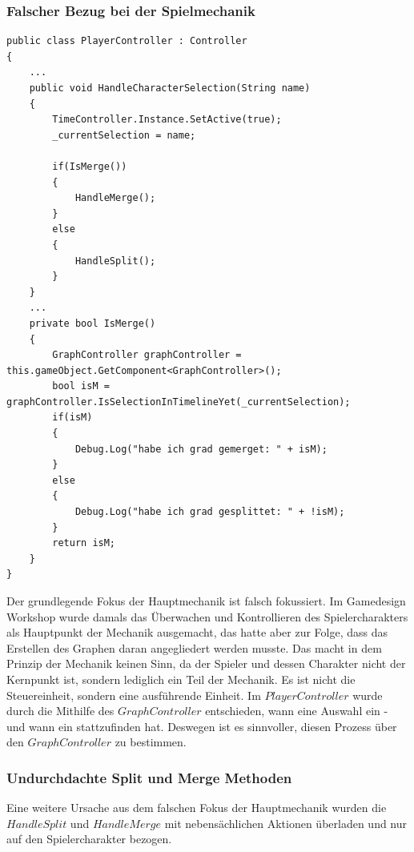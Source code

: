 \subsubsection{Falscher Bezug bei der Spielmechanik}
\begin{lstlisting}[caption={HandleCharacterSelection in der PlayerController.cs Klasse}, label={sec:playercontroller_old}]
public class PlayerController : Controller
{
    ...
    public void HandleCharacterSelection(String name)
    {
        TimeController.Instance.SetActive(true);
        _currentSelection = name;
        
        if(IsMerge())
        {
            HandleMerge();
        }
        else
        {
            HandleSplit();
        }
    }
    ...
    private bool IsMerge()
    {
        GraphController graphController = this.gameObject.GetComponent<GraphController>();
        bool isM = graphController.IsSelectionInTimelineYet(_currentSelection);
        if(isM)
        {   
            Debug.Log("habe ich grad gemerget: " + isM);
        }
        else
        {
            Debug.Log("habe ich grad gesplittet: " + !isM);
        }
        return isM;
    }
}
\end{lstlisting}
Der grundlegende Fokus der Hauptmechanik ist falsch fokussiert. Im Gamedesign Workshop wurde damals das Überwachen und Kontrollieren des Spielercharakters als Hauptpunkt der Mechanik ausgemacht, das hatte aber zur Folge, dass das Erstellen des Graphen daran angegliedert werden musste. Das macht in dem Prinzip der Mechanik keinen Sinn, da der Spieler und dessen Charakter nicht der Kernpunkt ist, sondern lediglich ein Teil der Mechanik. Es ist nicht die Steuereinheit, sondern eine ausführende Einheit. Im $PlayerController$ wurde durch die Mithilfe des $GraphController$ entschieden, wann eine Auswahl ein - und wann ein  stattzufinden hat. Deswegen ist es sinnvoller, diesen Prozess über den $GraphController$ zu bestimmen.

\subsubsection{Undurchdachte Split und Merge Methoden}
Eine weitere Ursache aus dem falschen Fokus der Hauptmechanik wurden die\\ $HandleSplit$ und $HandleMerge$ mit nebensächlichen Aktionen überladen und nur auf den Spielercharakter bezogen.

